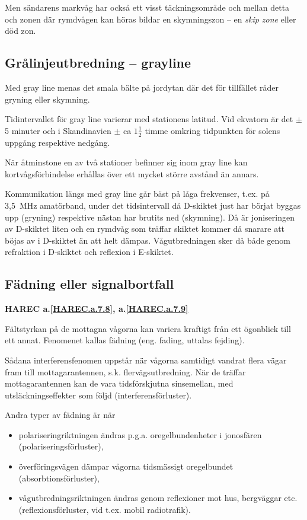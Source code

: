 Men sändarens markvåg har också ett visst täckningsområde och mellan
detta och zonen där rymdvågen kan höras bildar en skymningszon -- en
\emph{skip zone} eller död zon.

\subsection{Grålinjeutbredning -- grayline}

Med gray line menas det smala bälte på jordytan där det för tillfället
råder gryning eller skymning.

Tidintervallet för gray line varierar med stationens latitud. Vid
ekvatorn är det \(\pm\) 5 minuter och i Skandinavien \(\pm\) ca
\(1\frac{1}{2}\) timme omkring tidpunkten för solens uppgång
respektive nedgång.

När åtminstone en av två stationer befinner sig inom gray line kan
kortvågsförbindelse erhållas över ett mycket större avstånd än annars.

Kommunikation längs med gray line går bäst på låga frekvenser,
t.ex. på 3,5~MHz amatörband, under det tidsintervall då D-skiktet just
har börjat byggas upp (gryning) respektive nästan har brutits ned
(skymning). Då är joniseringen av D-skiktet liten och en rymdvåg som
träffar skiktet kommer då snarare att böjas av i D-skiktet än att helt
dämpas. Vågutbredningen sker då både genom refraktion i D-skiktet och
reflexion i E-skiktet.

\subsection{Fädning eller signalbortfall}
\textbf{
HAREC a.\ref{HAREC.a.7.8}\label{myHAREC.a.7.8},
 a.\ref{HAREC.a.7.9}\label{myHAREC.a.7.9}
}

Fältstyrkan på de mottagna vågorna kan variera kraftigt från ett
ögonblick till ett annat. Fenomenet kallas fädning (eng. fading,
uttalas fejding).

Sådana interferensfenomen uppstår när vågorna samtidigt vandrat flera
vägar fram till mottagarantennen, s.k. flervägsutbredning. När de
träffar mottagarantennen kan de vara tidsförskjutna sinsemellan, med
utsläckningseffekter som följd (interferensförluster).

Andra typer av fädning är när
\begin{itemize}
\item polariseringriktningen ändras p.g.a. oregelbundenheter i
  jonosfären (polariseringsförluster),
\item överföringsvägen dämpar vågorna tidsmässigt oregelbundet
  (absorbtionsförluster),
\item vågutbredningsriktningen ändras genom reflexioner mot hus,
  bergväggar etc. (reflexionsförluster, vid t.ex. mobil radiotrafik).
\end{itemize}

